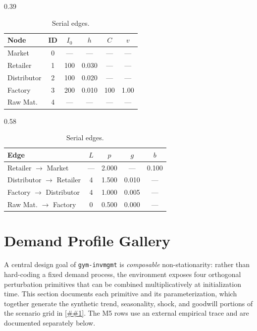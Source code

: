 \documentclass[10pt,a4paper]{article}
\providecommand{\Cref}[1]{\ref{##1}}
\begin{document}
\begin{table}[!tbp]
\vspace{0.35em}
\begin{subtable}[t]{0.39\textwidth}
\centering
\caption{Serial nodes.}
\label{tab:serial_nodes}
\begin{tabular}{@{} l c c c c c @{}}
\toprule
\textbf{Node} & \textbf{ID} & $I_0$ & $h$ & $C$ & $v$ \\
\midrule
Market & 0 & --- & ---   & --- & --- \\
Retailer & 1 & 100 & 0.030 & --- & --- \\
Distributor & 2 & 100 & 0.020 & --- & --- \\
Factory & 3 & 200 & 0.010 & 100 & 1.00 \\
Raw Mat. & 4 & --- & --- & --- & --- \\
\bottomrule
\end{tabular}
\end{subtable}
\hfill
\begin{subtable}[t]{0.58\textwidth}
\centering
\caption{Serial edges.}
\label{tab:serial_edges}
\begin{tabular}{@{} l c c c c @{}}
\toprule
\textbf{Edge} & $L$ & $p$ & $g$ & $b$ \\
\midrule
Retailer $\to$ Market & --- & 2.000 & ---   & 0.100 \\
Distributor $\to$ Retailer & 4  & 1.500 & 0.010 & --- \\
Factory $\to$ Distributor & 4  & 1.000 & 0.005 & --- \\
Raw Mat. $\to$ Factory & 0  & 0.500 & 0.000 & --- \\
\bottomrule
\end{tabular}
\end{subtable}
\end{table}

\section{Demand Profile Gallery}\label{sec:appendix_demand}

A central design goal of \texttt{gym-invmgmt} is \emph{composable}
non-stationarity: rather than hard-coding a fixed demand process,
the environment exposes four orthogonal perturbation primitives that
can be combined multiplicatively at initialization time.
This section documents each primitive and its parameterization,
which together generate the synthetic trend, seasonality, shock, and
goodwill portions of the scenario grid in \Cref{app:scenarios}. The M5
rows use an external empirical trace and are documented separately
below.
\end{document}
